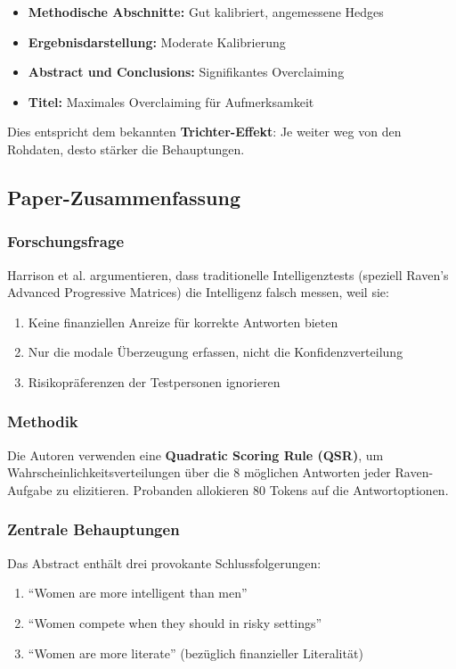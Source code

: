 \begin{itemize}
    \item \textbf{Methodische Abschnitte:} Gut kalibriert, angemessene Hedges
    \item \textbf{Ergebnisdarstellung:} Moderate Kalibrierung
    \item \textbf{Abstract und Conclusions:} Signifikantes Overclaiming
    \item \textbf{Titel:} Maximales Overclaiming f\"ur Aufmerksamkeit
\end{itemize}

Dies entspricht dem bekannten \textbf{Trichter-Effekt}: Je weiter weg von den Rohdaten, desto st\"arker die Behauptungen.


\subsection{Paper-Zusammenfassung}

\subsubsection{Forschungsfrage}

Harrison et al. argumentieren, dass traditionelle Intelligenztests (speziell Raven's Advanced Progressive Matrices) die Intelligenz falsch messen, weil sie:
\begin{enumerate}
    \item Keine finanziellen Anreize f\"ur korrekte Antworten bieten
    \item Nur die modale \"Uberzeugung erfassen, nicht die Konfidenzverteilung
    \item Risikopr\"aferenzen der Testpersonen ignorieren
\end{enumerate}

\subsubsection{Methodik}

Die Autoren verwenden eine \textbf{Quadratic Scoring Rule (QSR)}, um Wahrscheinlichkeitsverteilungen \"uber die 8 m\"oglichen Antworten jeder Raven-Aufgabe zu elizitieren. Probanden allokieren 80 Tokens auf die Antwortoptionen.

\subsubsection{Zentrale Behauptungen}

Das Abstract enth\"alt drei provokante Schlussfolgerungen:
\begin{enumerate}
    \item ``Women are more intelligent than men''
    \item ``Women compete when they should in risky settings''
    \item ``Women are more literate'' (bez\"uglich finanzieller Literalit\"at)
\end{enumerate}


